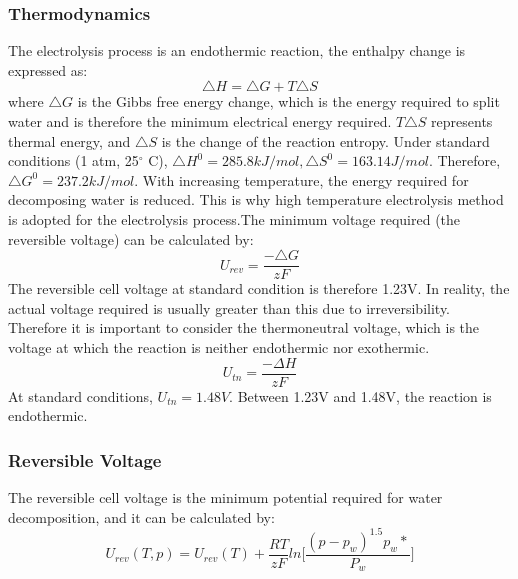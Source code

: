 \documentclass[11pt, a4paper]{article}
\begin{document}
\subsubsection{Thermodynamics} 
The electrolysis process is an endothermic reaction, the enthalpy change is expressed as:\cite{gibbs}
\begin{equation} 
\triangle H =\triangle G + T\triangle S 
\end{equation}
where $\triangle G $ is the Gibbs free energy change, which is the energy required to split water and is therefore the minimum electrical energy required. $T\triangle S$ represents thermal energy, and $\triangle S$ is the change of the reaction entropy.  
Under standard conditions (1 atm, 25$^{\circ}$ C), $\triangle H^0 = 285.8 kJ/mol, \triangle S^0 = 163.14 J/mol$. Therefore, $\triangle G^0 = 237.2 kJ/mol.$\cite{gibbs} With increasing temperature, the energy required for decomposing water is reduced. This is why high temperature electrolysis method is adopted for the electrolysis process.The minimum voltage required (the reversible voltage) can be calculated by:\cite{gibbs}
\begin{equation} 
U_{rev} =\frac {-\triangle G} {zF} 
\end{equation} 
The reversible cell voltage at standard condition is therefore 1.23V. In reality, the actual voltage required is usually greater than this due to irreversibility. Therefore it is important to consider the thermoneutral voltage, which is the voltage at which the reaction is neither endothermic nor exothermic. 
\begin{equation} 
U_{tn}=\frac{-\Delta H} {zF}
\end{equation} 
At standard conditions, $U_{tn} = 1.48V.$ Between 1.23V and 1.48V, the reaction is endothermic.

\subsubsection{Reversible Voltage} 
The reversible cell voltage is the minimum potential required for water decomposition, and it can be calculated by:\cite{reversible}
\begin{equation} 
U_{rev}(T,p)=U_{rev}(T) + \frac{RT} {zF}ln\bigg[\frac{(p-p_w)^{1.5}p_w*} {P_w}\bigg]
\end{equation} 
\end{document}
